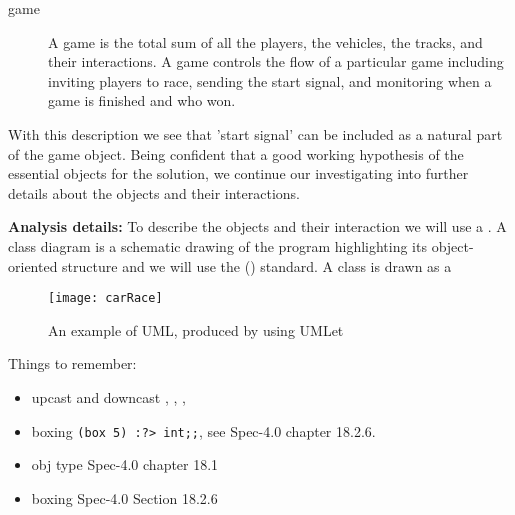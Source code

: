 \begin{description}
\item[game] A game is the total sum of all the players, the vehicles, the tracks, and their interactions. A game controls the flow of a particular game including inviting players to race, sending the start signal, and monitoring when a game is finished and who won.
\end{description}
With this description we see that 'start signal' can be included as a natural part of the game object. Being confident that a good working hypothesis of the essential objects for the solution, we continue our investigating into further details about the objects and their interactions.

\textbf{Analysis details:} To describe the objects and their interaction we will use a . A class diagram is a schematic drawing of the program highlighting its object-oriented structure and we will use the  () \cite{uml2} standard. A class is drawn as a 

\begin{figure}
  \centering
  \texttt{[image: carRace]}
  \caption{An example of UML, produced by using UMLet \cite{umlet}}
  \label{uml}
\end{figure}

Things to remember: 
\begin{itemize}
\item upcast and downcast , \lexeme{:>},
  , 
\item boxing \lstinline|(box 5) :?> int;;|, see Spec-4.0 chapter
  18.2.6.
\item obj type Spec-4.0 chapter 18.1
\item boxing Spec-4.0 Section 18.2.6
\end{itemize}

